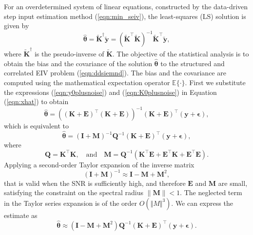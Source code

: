 For an overdetermined system of linear equations, constructed by the data-driven step input estimation method (\ref{eqn:min_seiv}), the least-squares (LS) solution is given by
\begin{equation} \widehat{\bm{\theta}} = \widetilde{\mathbf{K}}^\dagger \widetilde{\mathbf{y}} = ( \widetilde{\mathbf{K}}^\top \widetilde{\mathbf{K}} )^{-1} \widetilde{\mathbf{K}}^\top \widetilde{\mathbf{y}} , \label{eqn:xhat} \end{equation}
where $\widetilde{\mathbf{K}}^\dagger$ is the pseudo-inverse of $\widetilde{\mathbf{K}}$.
The objective of the statistical analysis is to obtain the bias and the covariance of the solution $\widehat{\bm{\theta}}$ to the structured and correlated EIV problem (\ref{eqn:ddsiemnd}).
The bias and the covariance are computed using the mathematical expectation operator $\mathbb{E}\{\cdot\}$.
First we substitute the expressions (\ref{eqn:y0plusnoise}) and (\ref{eqn:K0plusnoise}) in Equation (\ref{eqn:xhat}) to obtain
\begin{equation*} \widehat{\bm{\theta}} = \left( (\mathbf{K}+\mathbf{E})^\top (\mathbf{K}+\mathbf{E})  \right)^{-1} (\mathbf{K}+\mathbf{E})^\top (\mathbf{y}+\bm{\epsilon}), \end{equation*} 
which is equivalent to
\begin{equation} \widehat{\bm{\theta}} = \left( \mathbf{I} + \mathbf{M} \right)^{-1} \mathbf{Q}^{-1} (\mathbf{K}+\mathbf{E})^\top (\mathbf{y}+\bm{\epsilon}), \label{eqn:1steq} \end{equation} 
where 
\begin{equation} \mathbf{Q} = \mathbf{K}^\top \mathbf{K}, \quad \text{and} \quad \mathbf{M} = \mathbf{Q}^{-1} ( \mathbf{K}^\top \mathbf{E} + \mathbf{E}^\top \mathbf{K} + \mathbf{E}^\top \mathbf{E} ). \end{equation} 
Applying a second-order Taylor expansion of the inverse matrix
\begin{equation} (\mathbf{I} + \mathbf{M})^{-1} \approx \mathbf{I} - \mathbf{M} + \mathbf{M}^2, \label{eqn:TseriesExp} \end{equation} 
that is valid when the SNR is sufficiently high, and therefore $\mathbf{E}$ and $\mathbf{M}$ are small, satisfying the constraint on the spectral radius $\| \mathbf{M} \| < 1$. 
The neglected term in the Taylor series expansion is of the order $O(\Vert M \Vert^3)$.
We can express the estimate as
\begin{equation} \widehat{\bm{\theta}} \approx \left( \mathbf{I} - \mathbf{M} + \mathbf{M}^2 \right) \mathbf{Q}^{-1} (\mathbf{K}+\mathbf{E})^\top (\mathbf{y}+\bm{\epsilon}). \label{eqn:xhatexp} \end{equation} 

